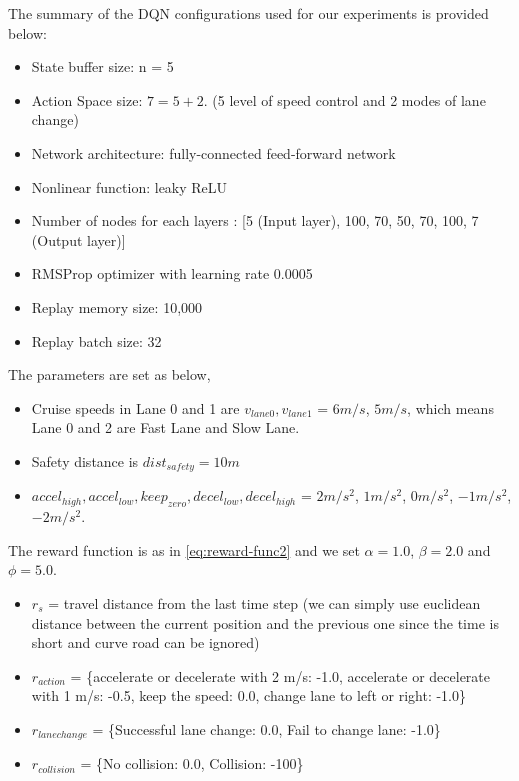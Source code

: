 The summary of the DQN configurations used for our experiments is provided below:

\begin{itemize}
\item State buffer size: n = 5
\item Action Space size: $7 = 5 + 2$. (5 level of speed control and 2 modes of lane change)
\item Network architecture: fully-connected feed-forward network
\item Nonlinear function: leaky ReLU
\item Number of nodes for each layers : [5 (Input layer), 100, 70, 50, 70, 100, 7 (Output layer)]
\item RMSProp optimizer with learning rate 0.0005
\item Replay memory size: 10,000
\item Replay batch size: 32
\end{itemize}

The parameters are set as below,

\begin{itemize}
\item Cruise speeds in Lane 0 and 1 are $v_{lane0}, v_{lane1}$ = $6 m/s$, $5 m/s$, which means Lane 0 and 2 are Fast Lane and Slow Lane.
\item Safety distance is $dist_{safety} = 10 m$
\item $accel_{high}, accel_{low}, keep_{zero}, decel_{low}, decel_{high}$ = $2 m/s^2$, $1 m/s^2$, $0 m/s^2$, $-1 m/s^2$, $-2 m/s^2$.
\end{itemize}

The reward function is as in \ref{eq:reward-func2} and we set $\alpha = 1.0$, $\beta = 2.0$ and $\phi = 5.0$. 

\begin{itemize}
 \item $r_s$ = travel distance from the last time step (we can simply use euclidean distance between the current position and the previous one since the time is short and curve road can be ignored)
 \item $r_{action}$ = \{accelerate or decelerate with 2 m/s: -1.0, accelerate or decelerate with 1 m/s: -0.5, keep the speed: 0.0, change lane to left or right: -1.0\}
 \item $r_{lanechange}$ = \{Successful lane change: 0.0, Fail to change lane: -1.0\}
 \item $r_{collision}$ = \{No collision: 0.0, Collision: -100\}
\end{itemize}

